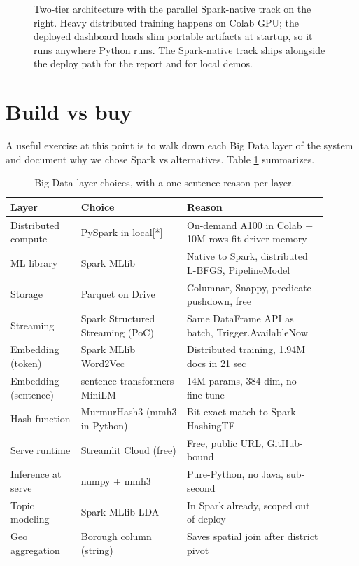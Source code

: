 \documentclass[11pt,letterpaper]{book}
\begin{document}
\begin{figure}[h]
  \caption{Two-tier architecture with the parallel Spark-native track on the right. Heavy distributed training happens on Colab GPU; the deployed dashboard loads slim portable artifacts at startup, so it runs anywhere Python runs. The Spark-native track ships alongside the deploy path for the report and for local demos.}
  \label{fig:arch-book}
\end{figure}

\section{Build vs buy}

A useful exercise at this point is to walk down each Big Data layer of the system and document why we chose Spark vs alternatives. Table \ref{tab:build-vs-buy} summarizes.

\begin{table}[h]
  \caption{Big Data layer choices, with a one-sentence reason per layer.}
  \label{tab:build-vs-buy}
  \centering
  \small
  \begin{tabular}{p{0.20\linewidth}p{0.30\linewidth}p{0.40\linewidth}}
    \toprule
    Layer & Choice & Reason \\
    \midrule
    Distributed compute & PySpark in local[*] & On-demand A100 in Colab + 10M rows fit driver memory \\
    ML library & Spark MLlib & Native to Spark, distributed L-BFGS, PipelineModel \\
    Storage & Parquet on Drive & Columnar, Snappy, predicate pushdown, free \\
    Streaming & Spark Structured Streaming (PoC) & Same DataFrame API as batch, Trigger.AvailableNow \\
    Embedding (token) & Spark MLlib Word2Vec & Distributed training, 1.94M docs in 21 sec \\
    Embedding (sentence) & sentence-transformers MiniLM & 14M params, 384-dim, no fine-tune \\
    Hash function & MurmurHash3 (mmh3 in Python) & Bit-exact match to Spark HashingTF \\
    Serve runtime & Streamlit Cloud (free) & Free, public URL, GitHub-bound \\
    Inference at serve & numpy + mmh3 & Pure-Python, no Java, sub-second \\
    Topic modeling & Spark MLlib LDA & In Spark already, scoped out of deploy \\
    Geo aggregation & Borough column (string) & Saves spatial join after district pivot \\
    \bottomrule
  \end{tabular}
\end{table}
\end{document}
